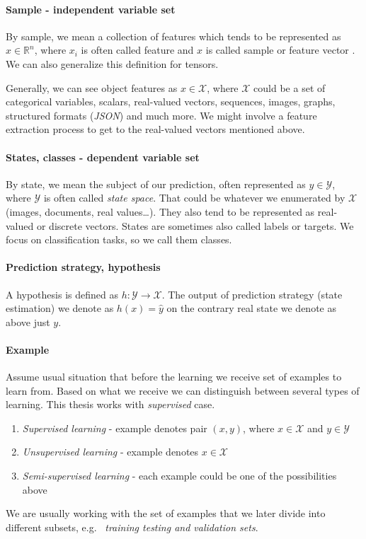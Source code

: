 \paragraph{Sample - independent variable set}
By sample, we mean a collection of features which tends to be represented as $x\in\mathbb{R}^{n}$, where $x_i$ is often called feature and $x$ is called sample or feature vector \cite{GoodBengCour16}. We can also generalize this definition for tensors.

Generally, we can see object features as $x \in \mathcal{X}$, where $\mathcal{X}$ could be a set of categorical variables, scalars, real-valued vectors, sequences, images, graphs, structured formats (\emph{JSON}) and much more. We might involve a feature extraction process to get to the real-valued vectors mentioned above.

\paragraph{States, classes - dependent variable set}
By state, we mean the subject of our prediction, often represented as $y \in \mathcal{Y}$, where $\mathcal{Y}$ is often called \emph{state space}. That could be whatever we enumerated by $\mathcal{X}$ (images, documents, real values\dots). They also tend to be represented as real-valued or discrete vectors. States are sometimes also called labels or targets. We focus on classification tasks, so we call them classes.

\paragraph{Prediction strategy, hypothesis}
A hypothesis is defined as $h:\mathcal{Y} \rightarrow \mathcal{X}$. The output of prediction strategy (state estimation) we denote as $h(x)=\hat{y}$ on the contrary real state we denote as above just $y$.

\paragraph{Example}
Assume usual situation that before the learning we receive set of examples to learn from. Based on what we receive we can distinguish between several types of learning. This thesis works with \emph{supervised} case.\
\begin{enumerate}
    \item \emph{Supervised learning} - example denotes pair $(x,y)$, where $x\in \mathcal{X}$ and $y\in \mathcal{Y}$
    \item \emph{Unsupervised learning} - example denotes $x\in \mathcal{X}$
    \item \emph{Semi-supervised learning} - each example could be one of the possibilities above
\end{enumerate}
We are usually working with the set of examples that we later divide into different subsets, e.g. \ \emph{training testing and validation sets}. \

